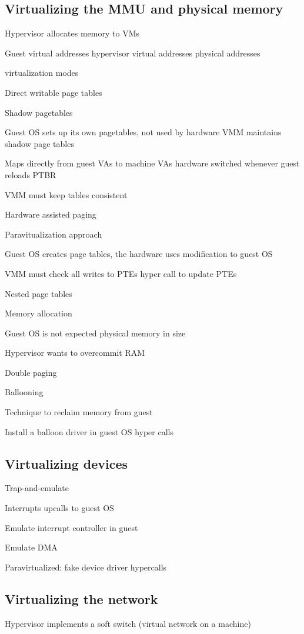 \subsection{Virtualizing the MMU and physical memory}
\enumstart
	\item Hypervisor allocates memory to VMs
	\item Guest virtual addresses \arrow hypervisor virtual addresses \arrow physical addresses
	\item virtualization modes
	\enumstart
		\item Direct writable page tables
		\item Shadow pagetables
		\enumstart
			\item Guest OS sets up its own pagetables, not used by hardware \arrow VMM maintains shadow page tables
			\item Maps directly from guest VAs to machine VAs \arrow hardware switched whenever guest reloads PTBR
			\item VMM must keep tables consistent
		\enumend
		\item Hardware assisted paging
	\enumend
	\item Paravitualization approach
	\enumstart
		\item Guest OS creates page tables, the hardware uses \arrow modification to guest OS
		\item VMM must check all writes to PTEs \arrow hyper call to update PTEs
	\enumend
	\item Nested page tables
	\item Memory allocation
	\enumstart
		\item Guest OS is not expected physical memory in size
		\item Hypervisor wants to overcommit RAM
		\item Double paging
		\item Ballooning
		\enumstart
			\item Technique to reclaim memory from guest
			\item Install a balloon driver in guest OS \arrow hyper calls
		\enumend
	\enumend
\enumend

\subsection{Virtualizing devices}
\enumstart
	\item Trap-and-emulate
	\item Interrupts \arrow upcalls to guest OS
	\enumstart
		\item Emulate interrupt controller in guest
		\item Emulate DMA
		\item Paravirtualized: fake device driver \arrow hypercalls
	\enumend
\enumend

\subsection{Virtualizing the network}
\enumstart
	\item Hypervisor implements a soft switch (virtual network on a machine)
\enumend
